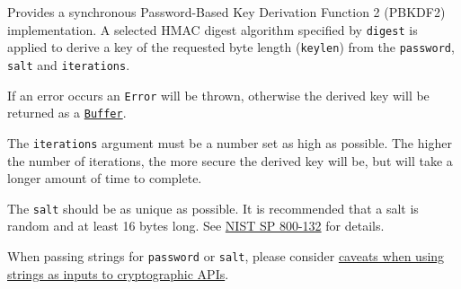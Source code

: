 Provides a synchronous Password-Based Key Derivation Function 2 (PBKDF2)
implementation. A selected HMAC digest algorithm specified by
\texttt{digest} is applied to derive a key of the requested byte length
(\texttt{keylen}) from the \texttt{password}, \texttt{salt} and
\texttt{iterations}.

If an error occurs an \texttt{Error} will be thrown, otherwise the
derived key will be returned as a \href{buffer.md}{\texttt{Buffer}}.

The \texttt{iterations} argument must be a number set as high as
possible. The higher the number of iterations, the more secure the
derived key will be, but will take a longer amount of time to complete.

The \texttt{salt} should be as unique as possible. It is recommended
that a salt is random and at least 16 bytes long. See
\href{https://nvlpubs.nist.gov/nistpubs/Legacy/SP/nistspecialpublication800-132.pdf}{NIST
SP 800-132} for details.

When passing strings for \texttt{password} or \texttt{salt}, please
consider
\hyperref[using-strings-as-inputs-to-cryptographic-apis]{caveats when
using strings as inputs to cryptographic APIs}.

\begin{Shaded}
\begin{Highlighting}[]
\NormalTok{ \{}
\OperatorTok{,}
\NormalTok{\} }\OperatorTok{=}  \NormalTok{(}\NormalTok{)}\OperatorTok{;}

\OperatorTok{=} \NormalTok{(}\OperatorTok{,} \OperatorTok{,} \OperatorTok{,} \OperatorTok{,} \NormalTok{)}\OperatorTok{;}
\NormalTok{(}\NormalTok{))}\OperatorTok{;}  
\end{Highlighting}
\end{Shaded}


